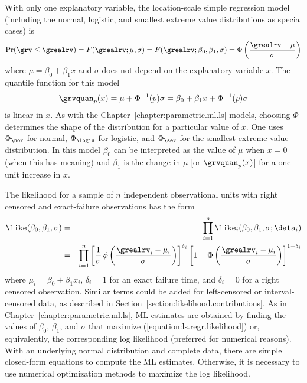 With only one explanatory variable, the location-scale simple regression
model (including the normal, logistic, and smallest
extreme value distributions as special cases) is
\begin{equation}
\label{equation:ls.regr.cdf.model}
	\Pr(\grv \leq \grealrv) = F(\grealrv;\mu,\sigma) = F(\grealrv;\beta_{0}, \beta_{1},\sigma) =
\Phi\left ( \frac{ \grealrv -\mu }{\sigma}\right )
\end{equation}
where $\mu=\beta_{0}+\beta_{1} x$ and $\sigma$ does not depend on 
the explanatory variable $x$.
The quantile function for this model
\begin{equation}
\label{equation:ls.reg.quant}
	\grvquan_{p}(x) = \mu+ \Phi^{-1}(p)\sigma=
\beta_{0}+\beta_{1} x + \Phi^{-1}(p)\sigma
\end{equation}
is linear in $x$. As with the 
Chapter~\ref{chapter:parametric.ml.ls} models, choosing
$\Phi$ determines the shape of the distribution for a particular value
of $x$. One uses $\Phi_{\nor}$ for normal, $\Phi_{\logis}$ for logistic, and
$\Phi_{\sev}$ for the smallest extreme value distribution. In this
model $\beta_{0}$ can be interpreted as the value of $\mu$ when $x=0$
(when this has meaning) and $\beta_{1}$ is the change in $\mu$ [or
$\grvquan_{p}(x)$] for a one-unit increase in $x$.

The likelihood for a sample of $n$ independent observational units with
right censored and exact-failure observations has the form
\begin{eqnarray}
\label{equation:ls.regr.likelihood}
	\like(\beta_{0},\beta_{1}, \sigma)&=& 	\prod_{i=1}^{n}
\like_{i}(\beta_{0},\beta_{1}, \sigma;\data_{i}) \nonumber \\ 	&=&
\prod_{i=1}^{n} 	\left [ \frac{1}{\sigma} \,
\phi	\left(\frac{\grealrv_{i} -
\mu_{i}}{\sigma}\right) 	\right ]^{\delta_{i}} 	\left [1-
\Phi\left( \frac{ \grealrv_{i} 	-\mu_{i} }
{\sigma} \right ) \right ]^{1-\delta_{i}}
\end{eqnarray}
where $\mu_{i}=\beta_{0}+\beta_{1} x_{i} $, $\delta_{i}=1$ for an
exact failure time, and $\delta_{i}=0$ for a right censored
observation. Similar terms could be added for left-censored or
interval-censored data, as described in
Section~\ref{section:likelihood.contributions}.  As in
Chapter~\ref{chapter:parametric.ml.ls}, ML estimates are obtained by
finding the values of $\beta_{0}$, $\beta_{1}$, and $\sigma$ that
maximize (\ref{equation:ls.regr.likelihood}) or, equivalently, the
corresponding log likelihood (preferred for numerical reasons).  With
an underlying normal distribution and complete data, there are simple
closed-form equations to compute the ML estimates. Otherwise, it is
necessary to use numerical optimization methods to maximize the
log likelihood.

